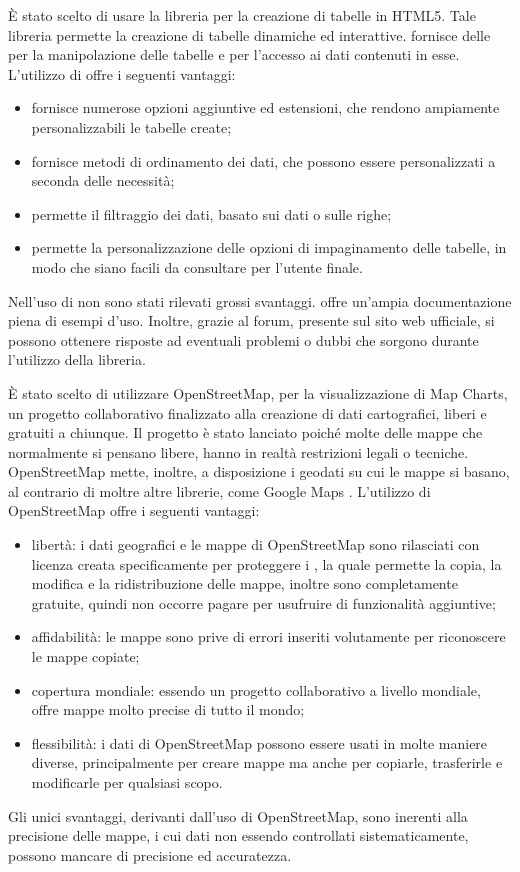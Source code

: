 È stato scelto di usare la libreria   per la creazione di tabelle in HTML5. Tale libreria permette la creazione di tabelle dinamiche ed interattive.  fornisce delle  per la manipolazione delle tabelle e per l'accesso ai dati contenuti in esse. 
L'utilizzo di  offre i seguenti vantaggi:
\begin{itemize}
\item fornisce numerose opzioni aggiuntive ed estensioni, che rendono ampiamente personalizzabili le tabelle create;
\item fornisce metodi di ordinamento dei dati, che possono essere personalizzati a seconda delle necessità;
\item permette il filtraggio dei dati, basato sui dati o sulle righe;
\item permette la personalizzazione delle opzioni di impaginamento delle tabelle, in modo che siano facili da consultare per l'utente finale.
\end{itemize}
Nell'uso di  non sono stati rilevati grossi svantaggi.  offre un'ampia documentazione piena di esempi d'uso. Inoltre, grazie al forum, presente sul sito web ufficiale, si possono ottenere risposte ad eventuali problemi o dubbi che sorgono durante l'utilizzo della libreria.

È stato scelto di utilizzare OpenStreetMap, per la visualizzazione di Map Charts, un progetto collaborativo finalizzato alla creazione di dati cartografici, liberi e gratuiti a chiunque. Il progetto è stato lanciato poiché molte delle mappe che normalmente si pensano libere, hanno in realtà restrizioni legali o tecniche. OpenStreetMap mette, inoltre, a disposizione i geodati su cui le mappe si basano, al contrario di moltre altre librerie, come Google Maps .
L'utilizzo di OpenStreetMap offre i seguenti vantaggi:
\begin{itemize}
\item libertà: i dati geografici e le mappe di OpenStreetMap sono rilasciati con licenza creata specificamente per proteggere i , la quale permette la copia, la modifica e la ridistribuzione delle mappe, inoltre sono completamente gratuite, quindi non occorre pagare per usufruire di funzionalità aggiuntive;
\item affidabilità: le mappe sono prive di errori inseriti volutamente per riconoscere le mappe copiate;
\item copertura mondiale: essendo un progetto collaborativo a livello mondiale, offre mappe molto precise di tutto il mondo;
\item flessibilità: i dati di OpenStreetMap possono essere usati in molte maniere diverse, principalmente per creare mappe ma anche per copiarle, trasferirle e modificarle per qualsiasi scopo.
\end{itemize}
Gli unici svantaggi, derivanti dall'uso di OpenStreetMap, sono inerenti alla precisione delle mappe, i cui dati non essendo controllati sistematicamente, possono mancare di precisione ed accuratezza.

